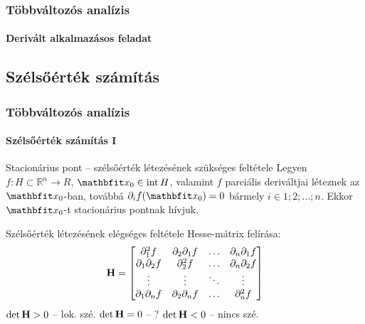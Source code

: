 \begin{frame}
  \frametitle{Többváltozós analízis}
  \framesubtitle{Derivált alkalmazásos feladat}

  
\end{frame}

\subsection{Szélsőérték számítás}

\begin{frame}
  \frametitle{Többváltozós analízis}
  \framesubtitle{Szélsőérték számítás I}

  \begin{block}{Stacionárius pont -- szélsőérték létezésének szükséges feltétele}
    Legyen $f : H \subset \mathbb R^n \rightarrow R$, $\rvec x_0 \in \mathrm{int}\, H$,
    valamint $f$ parciális deriváltjai léteznek az $\rvec x_0$-ban, továbbá
    $\partial_i f(\rvec x_0) = 0$ bármely $i \in {1; 2; \dots; n}$. Ekkor
    $\rvec x_0$-t stacionárius pontnak hívjuk.
  \end{block}

  \begin{block}{Szélsőérték létezésének elégséges feltétele}
    Hesse-mátrix felírása:
    \def\arraystretch{1.25}
    \[
      \mathbf{H} = \begin{bmatrix}
        \partial^2_1 f          & \partial_2 \partial_1 f & \hdots & \partial_n \partial_1 f \\
        \partial_1 \partial_2 f & \partial^2_2 f          & \hdots & \partial_n \partial_2 f \\
        \vdots                  & \vdots                  & \ddots & \vdots                  \\
        \partial_1 \partial_n f & \partial_2 \partial_n f & \hdots & \partial^2_n f          \\
      \end{bmatrix}
    \]
    $\det \mathbf{H} > 0$ -- lok. szé.
    \hfill
    $\det \mathbf{H} = 0$ -- ?
    \hfill
    $\det \mathbf{H} < 0$ -- nincs szé.
  \end{block}
\end{frame}

